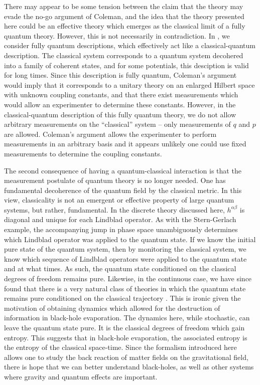 \documentclass[aps,pra,showpacs,citeautoscript,amsmath,amssymb,floatfix,superscriptaddress,bbm, verbatim,amsfonts,changes,11pt,nofootinbib,longbibliography]{revtex4-2}
\def\ab{^{\alpha\beta}}
\begin{document}
\label{par:tension}
	There may appear to be some tension  between the claim that the theory may evade the no-go argument of Coleman, and the idea that the theory presented here could be an effective theory which emerges as the classical limit of a fully quantum theory. However, this is not necessarily in contradiction.
	In  \cite{UCLQQtoCQ}, we consider fully quantum descriptions, which effectively act like a classical-quantum description. The classical system corresponds to a quantum system decohered into a family of coherent states, and for some potentials, this desciption is valid for long times. Since this description is fully quantum, Coleman's argument would imply that it corresponds to a unitary theory on an enlarged Hilbert space with unknown coupling constants, and that there exist measurements which would allow an experimenter to determine these constants.  However, in the classical-quantum description of this fully quantum theory, we do not allow arbitrary measurements on the ``classical'' system -- only measurements of $q$ and $p$ are allowed. Coleman's argument allows the experimenter to perform measurements in an arbitrary basis and it appears unlikely one could use fixed measurements to determine the coupling constants. 


The second consequence of having a quantum-classical interaction is that the measurement postulate of quantum theory is no longer needed. One has fundamental decoherence of the quantum field by the classical metric. In this view, classicality is not an emergent or effective property of large quantum systems, but rather, fundamental.
In the discrete theory discussed here, $h\ab$ is diagonal and unique for each Lindblad operator. As with the Stern-Gerlach example, the accompanying jump in phase space unambiguously determines which Lindblad operator was applied to the quantum state. If we know the initial pure state of the quantum system, then by monitoring the classical system, we know which sequence of Lindblad operators were applied to the quantum state and at what times. As such, the quantum state conditioned on the classical degrees of freedom remains pure. Likewise, in the continuous case, we have since found that 
there is a very natural class of theories in which the quantum state remains pure conditioned on the classical trajectory \cite{layton2022semi}.
	This is 
ironic given the motivation of obtaining dynamics which allowed for the destruction of information in black-hole evaporation. The dynamics here, while stochastic, can leave the quantum state pure. It is the classical degrees of freedom which gain entropy.
This suggests that in black-hole evaporation, the associated entropy is the entropy of the classical space-time. Since the formalism introduced here allows one to study the back reaction of matter fields on the gravitational field, there is hope that we can better understand black-holes, as well as other systems where gravity and quantum effects are important.
\end{document}

